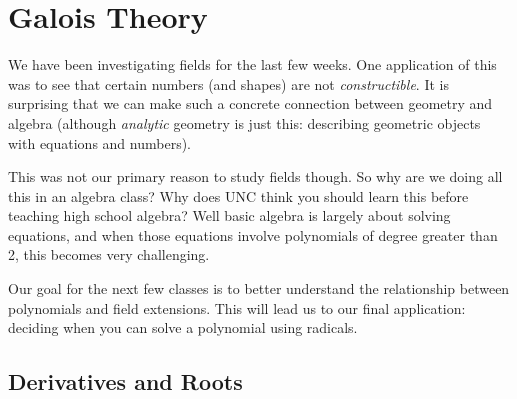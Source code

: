 \documentclass[12pt]{article}
\theoremstyle{plain}
\theoremstyle{definition}
\theoremstyle{remark}
\newcommand{\todayis}[1]{\clearpage{\rhead{\footnotesize #1}}}
\begin{document}
\todayis{Monday, February 4}

\section*{Galois Theory}
We have been investigating fields for the last few weeks.  One application of this was to see that certain numbers (and shapes) are not \emph{constructible}.  It is surprising that we can make such a concrete connection between geometry and algebra (although \emph{analytic} geometry is just this: describing geometric objects with equations and numbers).

This was not our primary reason to study fields though.  So why are we doing all this in an algebra class?  Why does UNC think you should learn this before teaching high school algebra?  Well basic algebra is largely about solving equations, and when those equations involve polynomials of degree greater than 2, this becomes very challenging.  

Our goal for the next few classes is to better understand the relationship between polynomials and field extensions.  This will lead us to our final application: deciding when you can solve a polynomial using radicals.

\subsection*{Derivatives and Roots}
\end{document}
